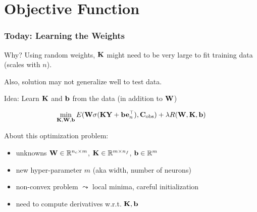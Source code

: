 \documentclass[12pt,fleqn,handout]{beamer}
\begin{document}
\section{Objective Function}

\begin{frame}\frametitle{Today: Learning the Weights}


Why? Using random weights, ${\bf K}$ might need to be very large to fit training data (scales with $n$).

Also, solution may not generalize well to test data.

\bigskip
\pause

Idea: Learn ${\bf K}$ and ${\bf b}$  from the data (in addition to ${\bf W}$)

$$ \min_{{\bf K},{\bf W},{\bf b}} E({\bf W}\sigma({\bf K} {\bf Y} + {\bf b}{\bf e}_n^\top), {\bf C}_{\rm obs}) + \lambda R({\bf W},{\bf K},{\bf b})$$

About this optimization problem:
\begin{itemize}
	\item unknowns ${\bf W} \in \mathbb{R}^{n_c \times m}$, ${\bf K} \in \mathbb{R}^{m \times n_f}$,  ${\bf b} \in \mathbb{R}^m$
	\item new hyper-parameter $m$ (aka width, number of neurons)
	\item  non-convex problem $\leadsto$ local minima, careful initialization
	\item need to compute derivatives w.r.t. ${\bf K}, {\bf b}$
\end{itemize}
\end{frame}
\end{document}

